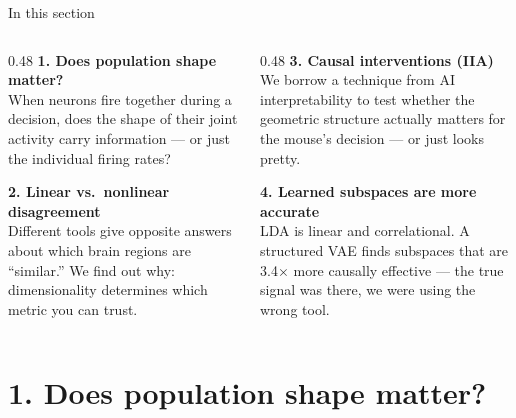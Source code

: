 \documentclass[aspectratio=169,11pt]{beamer}
\begin{document}
\begin{frame}{In this section}
\begin{columns}[T]
\begin{column}{0.48\textwidth}
\textbf{1. Does population shape matter?}\\[0.2em]
{\small When neurons fire together during a decision, does the shape of their joint activity carry information --- or just the individual firing rates?}

\vspace{0.6em}
\textbf{2. Linear vs.\ nonlinear disagreement}\\[0.2em]
{\small Different tools give opposite answers about which brain regions are ``similar.'' We find out why: dimensionality determines which metric you can trust.}
\end{column}
\begin{column}{0.48\textwidth}
\textbf{3. Causal interventions (IIA)}\\[0.2em]
{\small We borrow a technique from AI interpretability to test whether the geometric structure actually matters for the mouse's decision --- or just looks pretty.}

\vspace{0.6em}
\textbf{4. Learned subspaces are more accurate}\\[0.2em]
{\small LDA is linear and correlational. A structured VAE finds subspaces that are 3.4$\times$ more causally effective --- the true signal was there, we were using the wrong tool.}
\end{column}
\end{columns}
\end{frame}

\section{1. Does population shape matter?}
\end{document}
